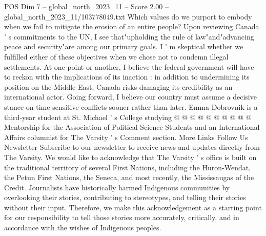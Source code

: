 \begin{textsample}{POS Dim 7 – global\_north\_2023\_11 – Score 2.00 – global\_north\_2023\_11/103778049.txt}
Which values do we purport to embody when we fail to mitigate the erosion of an entire people?
Upon reviewing Canada ' s commitments to the UN, I see that"upholding the rule of law"and"advancing peace and security"are among our primary goals.
I ' m skeptical whether we fulfilled either of these objectives when we chose not to condemn illegal settlements.
At one point or another, I believe the federal government will have to reckon with the implications of its inaction : in addition to undermining its position on the Middle East, Canada risks damaging its credibility as an international actor.
Going forward, I believe our country must assume a decisive stance on time-sensitive conflicts sooner rather than later.
Emma Dobrovnik is a third-year student at St.
Michael ' s College studying @ @ @ @ @ @ @ @ @ @ Mentorship for the Association of Political Science Students and an International Affairs columnist for The Varsity ' s Comment section.
More Links Follow Us Newsletter Subscribe to our newsletter to receive news and updates directly from The Varsity.
We would like to acknowledge that The Varsity ' s office is built on the traditional territory of several First Nations, including the Huron-Wendat, the Petun First Nations, the Seneca, and most recently, the Mississaugas of the Credit.
Journalists have historically harmed Indigenous communities by overlooking their stories, contributing to stereotypes, and telling their stories without their input.
Therefore, we make this acknowledgement as a starting point for our responsibility to tell those stories more accurately, critically, and in accordance with the wishes of Indigenous peoples.

\end{textsample}
